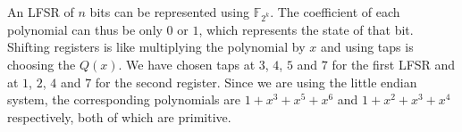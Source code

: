 An LFSR of $n$ bits can be represented using $\mathbb{F}_{2^k}$. The coefficient of each polynomial can thus be only $0$ or $1$, which represents the state of that bit. Shifting registers is like multiplying the polynomial by $x$ and using taps is choosing the $Q(x)$. We have chosen taps at $3$, $4$, $5$ and $7$ for the first LFSR and at $1$, $2$, $4$ and $7$ for the second register. Since we are using the little endian system, the corresponding polynomials are $1+x^3+x^5+x^6$ and $1+x^2+x^3+x^4$ respectively, both of which are primitive.

